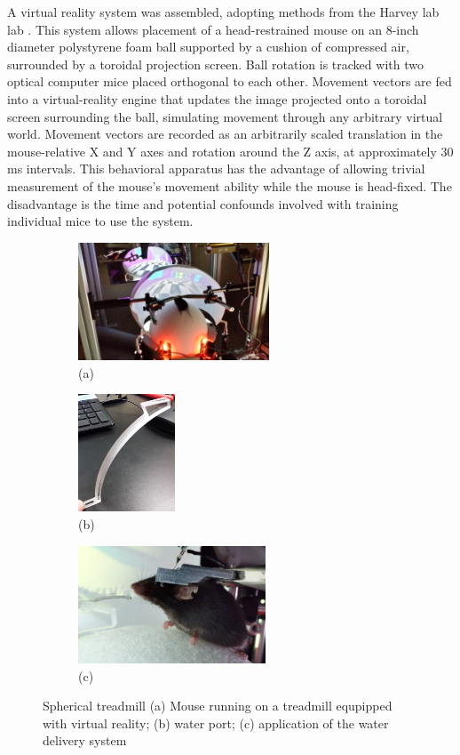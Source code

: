 A virtual reality system was assembled, adopting methods from the Harvey lab lab \cite{harvey_intracellular_2009}.
This system allows placement of a head-restrained mouse on an 8-inch diameter polystyrene foam ball supported by a cushion of compressed air, surrounded by a toroidal projection screen.
Ball rotation is tracked with two optical computer mice placed orthogonal to each other.
Movement vectors are fed into a virtual-reality engine that updates the image projected onto a toroidal screen surrounding the ball, simulating movement through any arbitrary virtual world.
Movement vectors are recorded as an arbitrarily scaled translation in the mouse-relative X and Y axes and rotation around the Z axis, at approximately 30 ms intervals.
This behavioral apparatus has the advantage of allowing trivial measurement of the mouse's movement ability while the mouse is head-fixed.
The disadvantage is the time and potential confounds involved with training individual mice to use the system.

\begin{figure}[htb]
	\begin{subfigure}[t]{0.32\linewidth}\centering
		\includegraphics[height=3.5cm]{figures/01-treadmill-mouse-running.jpg}
		\caption{(a)}
	\end{subfigure}
	\hfill
	\begin{subfigure}[t]{0.15\linewidth}\centering
		\includegraphics[height=3.5cm]{figures/01-water-port.jpg}
		\caption{(b)}
	\end{subfigure}
	\begin{subfigure}[t]{0.45\linewidth}\centering
		\includegraphics[height=3.5cm]{figures/03-water-delivery-zoom.jpg}
		\caption{(c)}
	\end{subfigure}
	\caption{
		Spherical treadmill (a) Mouse running on a treadmill equpipped with virtual reality;
		(b) water port; (c) application of the water delivery system }
	\label{fig:spherical-treadmill}
\end{figure}


